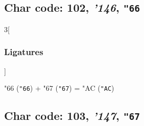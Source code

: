 \documentclass{article}
\newlength{\maxcharwidth}
\begin{document}
\subsection{Char code: 102, {\it'146}, {\tt"66}}
\label{char_102}


\begin{multicols}{3}[\subsubsection{Ligatures}]

{\testfont\char"66\noboundary} ({\tt"66}) + {\testfont\char"67\noboundary} ({\tt"67}) = {\testfont\char"AC\noboundary} ({\tt"AC}) 

\end{multicols}

\subsection{Char code: 103, {\it'147}, {\tt"67}}
\label{char_103}

\end{document}
